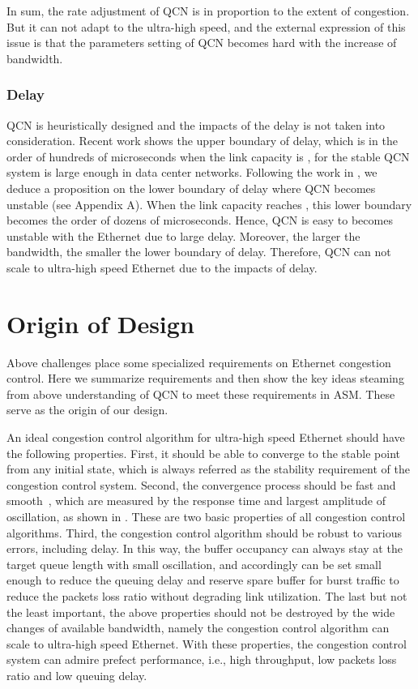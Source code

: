 \documentclass{sig-alternate-10pt}
\begin{document}
In sum, the rate adjustment of QCN is in proportion to the extent of congestion. But it can not adapt to the ultra-high speed, and the external expression of this issue is that the parameters setting of QCN becomes hard with the increase of bandwidth.


\subsubsection{Delay}
QCN is heuristically designed and the impacts of the delay is not taken into consideration. Recent work  shows the upper boundary of delay, which is in the order of hundreds of microseconds when the link capacity is , for the stable QCN system is large enough in data center networks. Following the work in , we deduce a proposition on the lower boundary of delay where QCN becomes unstable (see Appendix A). When the link capacity reaches , this lower boundary becomes the order of dozens of microseconds. Hence, QCN is easy to becomes unstable with the  Ethernet due to large delay. Moreover, the larger the bandwidth, the smaller the lower boundary of delay. Therefore, QCN can not scale to ultra-high speed Ethernet due to the impacts of delay.




\section{Origin of Design}
Above challenges place some specialized requirements on Ethernet congestion control. Here we summarize requirements and then show the key ideas steaming from above understanding of QCN to meet these requirements in ASM. These serve as the origin of our design.

An ideal congestion control algorithm for ultra-high speed Ethernet should have the following properties. First, it should be able to converge to the stable point  from any initial state, which is always referred as the stability requirement of the congestion control system. Second, the convergence process should be fast and smooth~\cite{Metrics}, which are measured by the response time and largest amplitude of oscillation, as shown in . These are two basic properties of all congestion control algorithms. Third, the congestion control algorithm should be robust to various errors, including delay. In this way, the buffer occupancy can always stay at the target queue length  with small oscillation, and accordingly  can be set small enough to reduce the queuing delay and reserve spare buffer for burst traffic to reduce the packets loss ratio without degrading link utilization. The last but not the least important, the above properties should not be destroyed by the wide changes of available bandwidth, namely the congestion control algorithm can scale to ultra-high speed Ethernet. With these properties, the congestion control system can admire prefect performance, i.e.,  high throughput, low packets loss ratio and low queuing delay. 
\end{document}
